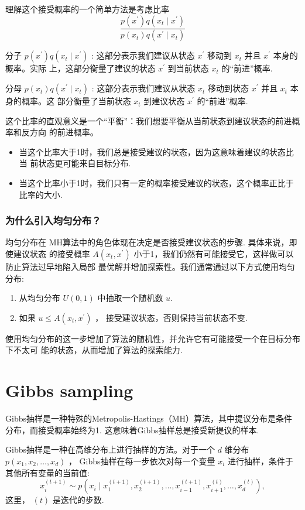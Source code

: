 \documentclass[UTF8,12pt]{ctexart}
\numberwithin{equation}{section}%
\begin{document}
	理解这个接受概率的一个简单方法是考虑比率
	$$
	\frac{p\left(x^{\prime}\right) q\left(x_t \mid x^{\prime}\right)}{p\left(x_t\right) q\left(x^{\prime} \mid x_t\right)}
	$$
	
	分子 $p\left(x^{\prime}\right) q\left(x_t \mid x^{\prime}\right)$ : 这部分表示我们建议从状态 $x^{\prime}$ 移动到 $x_t$ 并且 $x^{\prime}$ 本身的概率。实际 上，这部分衡量了建议的状态 $x^{\prime}$ 到当前状态 $x_t$ 的“前进”概率.
	
	分母 $p\left(x_t\right) q\left(x^{\prime} \mid x_t\right)$ : 这部分表示我们建议从状态 $x_t$ 移动到状态 $x^{\prime}$ 并且 $x_t$ 本身的概率。这 部分衡量了当前状态 $x_t$ 到建议状态 $x^{\prime}$ 的“前进”概率.
	
	这个比率的直观意义是一个“平衡”：我们想要平衡从当前状态到建议状态的前进概率和反方向 的前进概率。
	\begin{itemize}
		\item 当这个比率大于1时，我们总是接受建议的状态，因为这意味着建议的状态比当 前状态更可能来自目标分布.
		\item 当这个比率小于1时，我们只有一定的概率接受建议的状态，这个概率正比于比率的大小.
	\end{itemize}
	\subsubsection{为什么引入均匀分布？}
	均匀分布在 $\mathrm{MH}$算法中的角色体现在决定是否接受建议状态的步骤. 具体来说，即使建议状态 的接受概率 $A\left(x_t, x^{\prime}\right)$ 小于1，我们仍然有可能接受它，这样做可以防止算法过早地陷入局部 最优解并增加探索性。我们通常通过以下方式使用均匀分布:
	\begin{enumerate}
		\item 从均匀分布 $U(0,1)$ 中抽取一个随机数 $u$.
		\item  如果 $u \leq A\left(x_t, x^{\prime}\right)$ ， 接受建议状态，否则保持当前状态不变.
	\end{enumerate}
	
	使用均匀分布的这一步增加了算法的随机性，并允许它有可能接受一个在目标分布下不太可 能的状态，从而增加了算法的探索能力.

	\section{Gibbs sampling}
	Gibbs抽样是一种特殊的Metropolis-Hastings（MH）算法，其中提议分布是条件分布，而接受概率始终为1. 这意味着Gibbs抽样总是接受新提议的样本.
	
	\begin{tcolorbox}[title=Gibbs sampling]
		Gibbs抽样是一种在高维分布上进行抽样的方法。对于一个 $d$ 维分布 $p\left(x_1, x_2, \ldots, x_d\right)$ ， Gibbs抽样在每一步依次对每一个变量 $x_i$ 进行抽样，条件于其他所有变量的当前值:
		$$
		x_i^{(t+1)} \sim p\left(x_i \mid x_1^{(t+1)}, x_2^{(t+1)}, \ldots, x_{i-1}^{(t+1)}, x_{i+1}^{(t)}, \ldots, x_d^{(t)}\right),
		$$
		这里， $(t)$ 是迭代的步数.
	\end{tcolorbox}
	
\end{document}

